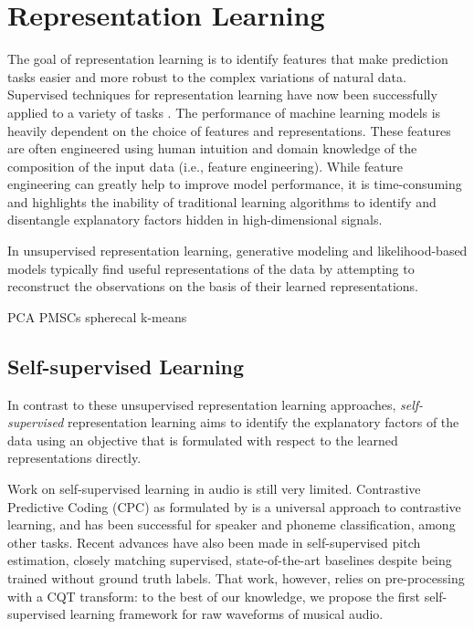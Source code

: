 \documentclass{report}
\begin{document}
\section{Representation Learning}

The goal of representation learning is to identify features that make  prediction tasks easier and more robust to the complex variations of natural data\cite{bengio2013representation}. Supervised techniques for representation learning have now been successfully applied to a variety of tasks \cite{korzeniowski_fully_2016, chen_harmony_2019, korzeniowski_end--end_2017, bock_joint_2016, pons_end--end_2017, van_den_oord_deep_2013}. The performance of machine learning models is heavily dependent on the choice of features and representations. These features are often engineered using human intuition and domain knowledge of the composition of the input data (i.e., feature engineering). While feature engineering can greatly help to improve model performance, it is time-consuming and highlights the inability of traditional learning algorithms to identify and disentangle explanatory factors hidden in high-dimensional signals. 

In unsupervised representation learning, generative modeling and likelihood-based models typically find useful representations of the data by attempting to reconstruct the observations on the basis of their learned representations\cite{goodfellow2014generative, unsupervised_gan}.



PCA PMSCs spherecal k-means



\subsection{Self-supervised Learning}
In contrast to these unsupervised representation learning approaches, \emph{self-supervised} representation learning aims to identify the explanatory factors of the data using an objective that is formulated with respect to the learned representations directly.

Work on self-supervised learning in audio is still very limited. Contrastive Predictive Coding (CPC) as formulated by \cite{oord_representation_2019} is a universal approach to contrastive learning, and has been successful for speaker and phoneme classification, among other tasks. Recent advances have also been made in self-supervised pitch estimation\cite{spice}, closely matching supervised, state-of-the-art baselines despite being trained without ground truth labels. That work, however, relies on pre-processing with a CQT transform: to the best of our knowledge, we propose the first self-supervised learning framework for raw waveforms of musical audio. 
\end{document}
